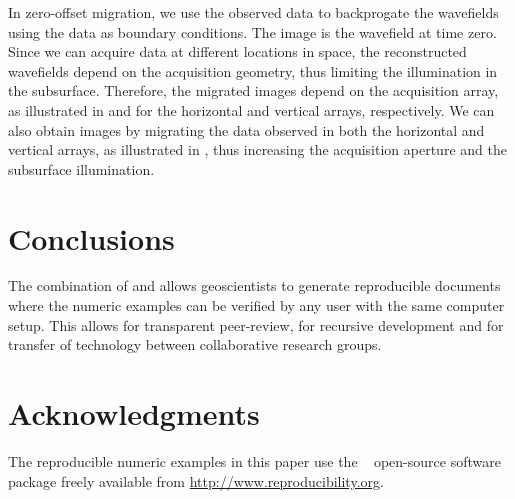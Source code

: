 
In zero-offset migration, we use the observed data to backprogate the
wavefields using the data as boundary conditions. The image is the
wavefield at time zero. Since we can acquire data at different
locations in space, the reconstructed wavefields depend on the
acquisition geometry, thus limiting the illumination in the
subsurface. Therefore, the migrated images depend on the acquisition
array, as illustrated in  and  for the horizontal
and vertical arrays, respectively. 
We can also obtain images by migrating the data observed in both the
horizontal and vertical arrays, as illustrated in , thus
increasing the acquisition aperture and the subsurface illumination.



\section{Conclusions}
The combination of \latex and \mg allows geoscientists to generate
reproducible documents where the numeric examples can be verified by
any user with the same computer setup. This allows for transparent
peer-review, for recursive development and for transfer of technology
between collaborative research groups.

\section{Acknowledgments}
The reproducible numeric examples in this paper use the \mg~
open-source software package freely available from
\url{http://www.reproducibility.org}.




